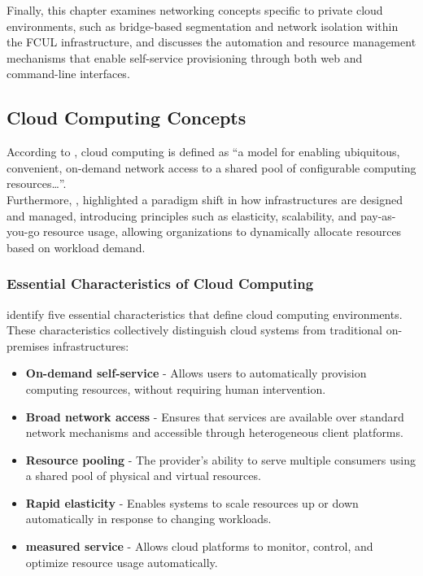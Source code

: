 \documentclass[sigplan]{acmart}
\begin{document}
    Finally, this chapter examines networking concepts specific to private cloud environments, such as bridge-based segmentation and network isolation within the FCUL infrastructure, and discusses the automation and resource management mechanisms that enable self-service provisioning through both web and command-line interfaces.\\

    \subsection{Cloud Computing Concepts} \label{sec:background.concepts}
        According to \citeauthor{mellNISTDefinitionCloud} \cite{mellNISTDefinitionCloud}, cloud computing is defined as “a model for enabling ubiquitous, convenient, on-demand network access to a shared pool of configurable computing resources…”. \\
        
        Furthermore, \citeauthor{armbrustCloudsBerkeleyView2009}\cite{armbrustCloudsBerkeleyView2009}, highlighted a paradigm shift in how infrastructures are designed and managed, introducing principles such as elasticity, scalability, and pay-as-you-go resource usage, allowing organizations to dynamically allocate resources based on workload demand.
    
        \subsubsection{Essential Characteristics of Cloud Computing}
            \citeauthor{mellNISTDefinitionCloud}\cite{mellNISTDefinitionCloud} identify five essential characteristics that define cloud computing environments. These characteristics collectively distinguish cloud systems from traditional on-premises infrastructures:
    
            \begin{itemize}
                \item \textbf{On-demand self-service} - Allows users to automatically provision computing resources, without requiring human intervention. 
                
                \item \textbf{Broad network access} - Ensures that services are available over standard network mechanisms and accessible through heterogeneous client platforms.
                
                \item \textbf{Resource pooling} - The provider's ability to serve multiple consumers using a shared pool of physical and virtual resources.
                
                \item \textbf{Rapid elasticity} - Enables systems to scale resources up or down automatically in response to changing workloads. 
            
                \item \textbf{measured service} - Allows cloud platforms to monitor, control, and optimize resource usage automatically.
            
            \end{itemize}
            
\end{document}
